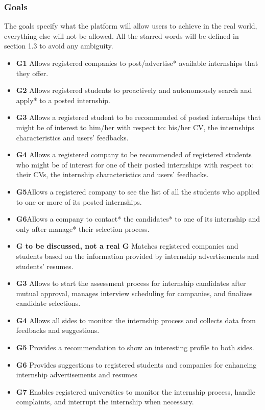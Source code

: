 \documentclass{article}
\begin{document}
\subsubsection{Goals}
The goals specify what the platform will allow users to achieve in the real world, everything else will not be allowed. 
All the starred words will be defined in section 1.3 to avoid any ambiguity.
\begin{itemize}
  \item \textbf{G1} Allows registered companies to post/advertise* available internships that they offer.
  \item \textbf{G2} Allows registered students to proactively and autonomously search and apply* to a posted internship.
  \item \textbf{G3} Allows a registered student to be recommended of posted internships that might be of interest to him/her with respect to: his/her CV, the internships characteristics and users' feedbacks.
  \item \textbf{G4} Allows a registered company to be recommended of registered students who might be of interest for one of their posted internships with respect to: their CVs, the internship characteristics and users' feedbacks.
  \item \textbf{G5}Allows a registered company to see the list of all the students who applied to one or more of its posted internships.
  \item \textbf{G6}Allows a company to contact* the candidates* to one of its internship and only after manage* their selection process. 
  \item \textbf{G to be discussed, not a real G} Matches registered companies and students based on the information provided by internship advertisements and students' resumes.
   \item \textbf{G3} Allows to start the assessment process for internship candidates after mutual approval, manages interview scheduling for companies, and finalizes candidate selections.
   \item \textbf{G4} Allows all sides to monitor the internship process and collects data from feedbacks and suggestions.
    \item \textbf{G5} Provides a recommendation to show an interesting profile to both sides.
    \item \textbf{G6} Provides suggestions to registered students and companies for enhancing internship advertisements and resumes
    \item \textbf{G7} Enables registered universities to monitor the internship process, handle complaints, and interrupt the internship when necessary.

\end{itemize}
\end{document}
